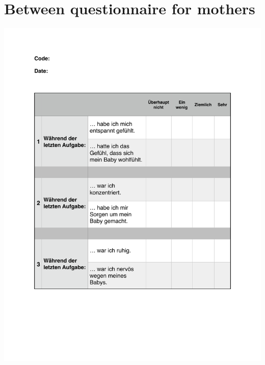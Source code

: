 \chapter{Between questionnaire for mothers}\label{appendix.between.mother}
\begin{center}
\includegraphics[page=1,scale=0.8,trim={60 90 0 90},clip]{"Appendix/Between_Task_Questions_Mothers"}
\end{center}







% 
% 
% 

